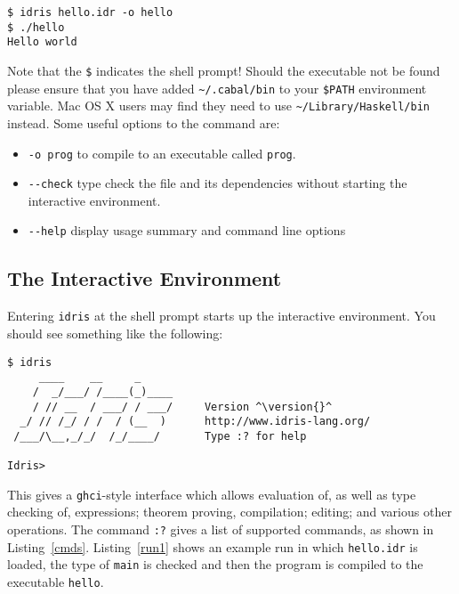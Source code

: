\begin{lstlisting}[style=stdout]
$ idris hello.idr -o hello
$ ./hello
Hello world
\end{lstlisting}

\noindent
Note that the \texttt{\$} indicates the shell prompt!
Should the \Idris{} executable not be found please ensure that you have added \verb!~/.cabal/bin! to your \verb!$PATH! environment variable.
Mac OS X users may find they need to use \verb!~/Library/Haskell/bin! instead.
Some useful options to the \Idris{} command are:

\begin{itemize}
\item \verb!-o prog! to compile to an executable called \texttt{prog}.
\item \verb!--check! type check the file and its dependencies without starting the
interactive environment.
\item \verb!--help! display usage summary and command line options
\end{itemize}

\subsection{The Interactive Environment}

Entering \texttt{idris} at the shell prompt starts up the interactive environment.
You should see something like the following:

\begin{lstlisting}[style=stdout]
$ idris
     ____    __     _
    /  _/___/ /____(_)____
    / // __  / ___/ / ___/     Version ^\version{}^
  _/ // /_/ / /  / (__  )      http://www.idris-lang.org/
 /___/\__,_/_/  /_/____/       Type :? for help

Idris>
\end{lstlisting}

\noindent
This gives a \texttt{ghci}-style interface which allows evaluation of, as well as type checking of, expressions; theorem proving, compilation; editing; and various other operations.
The command \texttt{:?} gives a list of supported commands, as shown in Listing~\ref{cmds}.
Listing~\ref{run1} shows an example run in which \texttt{hello.idr} is loaded, the type of \texttt{main} is checked and then the program is compiled to the executable \texttt{hello}.

